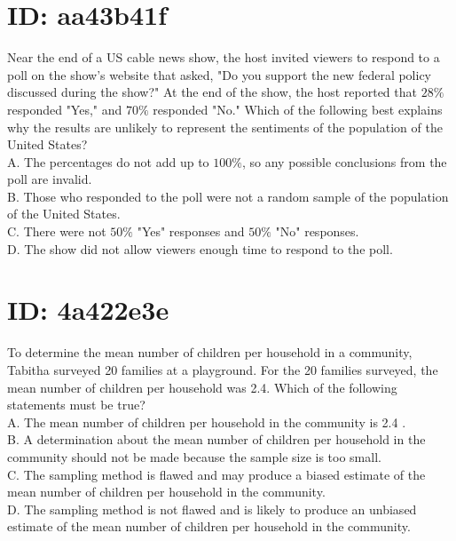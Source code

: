 \section*{ID: aa43b41f}
Near the end of a US cable news show, the host invited viewers to respond to a poll on the show's website that asked, "Do you support the new federal policy discussed during the show?" At the end of the show, the host reported that $28 \%$ responded "Yes," and $70 \%$ responded "No." Which of the following best explains why the results are unlikely to represent the sentiments of the population of the United States?\\
A. The percentages do not add up to $100 \%$, so any possible conclusions from the poll are invalid.\\
B. Those who responded to the poll were not a random sample of the population of the United States.\\
C. There were not $50 \%$ "Yes" responses and $50 \%$ "No" responses.\\
D. The show did not allow viewers enough time to respond to the poll.

\section*{ID: 4a422e3e}
To determine the mean number of children per household in a community, Tabitha surveyed 20 families at a playground. For the 20 families surveyed, the mean number of children per household was 2.4. Which of the following statements must be true?\\
A. The mean number of children per household in the community is 2.4 .\\
B. A determination about the mean number of children per household in the community should not be made because the sample size is too small.\\
C. The sampling method is flawed and may produce a biased estimate of the mean number of children per household in the community.\\
D. The sampling method is not flawed and is likely to produce an unbiased estimate of the mean number of children per household in the community.



